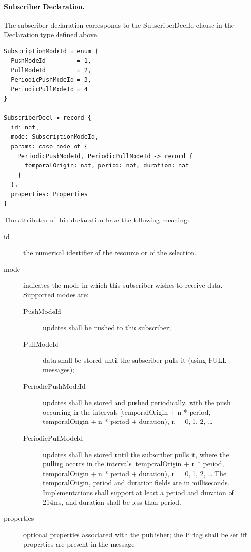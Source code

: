 \documentclass[a4paper,oneside,article]{memoir}
\begin{document}
\paragraph{Subscriber Declaration.} The subscriber declaration corresponds to the SubscriberDeclId
clause in the Declaration type defined above.
\begin{verbatim}
SubscriptionModeId = enum {
  PushModeId         = 1,
  PullModeId         = 2,
  PeriodicPushModeId = 3,
  PeriodicPullModeId = 4
}

SubscriberDecl = record {
  id: nat,
  mode: SubscriptionModeId,
  params: case mode of {
    PeriodicPushModeId, PeriodicPullModeId -> record {
      temporalOrigin: nat, period: nat, duration: nat
    }
  },
  properties: Properties
}
\end{verbatim}
The attributes of this declaration have the following meaning:
\begin{description}
\item[id] the numerical identifier of the resource or of the selection.
\item[mode] indicates the mode in which this subscriber wishes to receive data. Supported modes are:
  \begin{description}
  \item[PushModeId] updates shall be pushed to this subscriber;
  \item[PullModeId] data shall be stored until the subscriber pulls it (using PULL messages);
  \item[PeriodicPushModeId] updates shall be stored and pushed periodically, with the push occurring
    in the intervals [temporalOrigin + n * period, temporalOrigin + n * period + duration), n = 0,
    1, 2, …
  \item[PeriodicPullModeId] updates shall be stored until the subscriber pulls it, where the pulling
    occurs in the intervals [temporalOrigin + n * period, temporalOrigin + n * period + duration), n
    = 0, 1, 2, …  The temporalOrigin, period and duration fields are in
    milliseconds. Implementations shall support at least a period and duration of 214ms, and
    duration shall be less than period.
  \end{description}
\item[properties] optional properties associated with the publisher; the P flag shall be set iff
  properties are present in the message.
\end{description}
\end{document}
